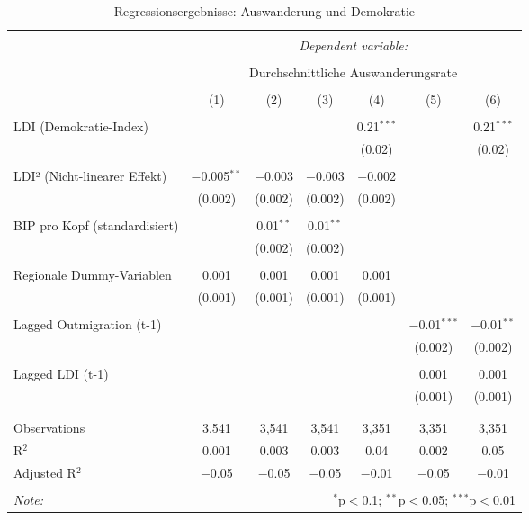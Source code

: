 
\begin{table}[!htbp] \centering 
  \caption{Regressionsergebnisse: Auswanderung und Demokratie} 
  \label{} 
\scriptsize 
\begin{tabular}{@{\extracolsep{2pt}}lcccccc} 
\\[-1.8ex]\hline 
\hline \\[-1.8ex] 
 & \multicolumn{6}{c}{\textit{Dependent variable:}} \\ 
\cline{2-7} 
\\[-1.8ex] & \multicolumn{6}{c}{Durchschnittliche Auswanderungsrate} \\ 
\\[-1.8ex] & (1) & (2) & (3) & (4) & (5) & (6)\\ 
\hline \\[-1.8ex] 
 LDI (Demokratie-Index) &  &  &  & 0.21$^{***}$ &  & 0.21$^{***}$ \\ 
  &  &  &  & (0.02) &  & (0.02) \\ 
  & & & & & & \\ 
 LDI² (Nicht-linearer Effekt) & $-$0.005$^{**}$ & $-$0.003 & $-$0.003 & $-$0.002 &  &  \\ 
  & (0.002) & (0.002) & (0.002) & (0.002) &  &  \\ 
  & & & & & & \\ 
 BIP pro Kopf (standardisiert) &  & 0.01$^{**}$ & 0.01$^{**}$ &  &  &  \\ 
  &  & (0.002) & (0.002) &  &  &  \\ 
  & & & & & & \\ 
 Regionale Dummy-Variablen & 0.001 & 0.001 & 0.001 & 0.001 &  &  \\ 
  & (0.001) & (0.001) & (0.001) & (0.001) &  &  \\ 
  & & & & & & \\ 
 Lagged Outmigration (t-1) &  &  &  &  & $-$0.01$^{***}$ & $-$0.01$^{**}$ \\ 
  &  &  &  &  & (0.002) & (0.002) \\ 
  & & & & & & \\ 
 Lagged LDI (t-1) &  &  &  &  & 0.001 & 0.001 \\ 
  &  &  &  &  & (0.001) & (0.001) \\ 
  & & & & & & \\ 
\hline \\[-1.8ex] 
Observations & 3,541 & 3,541 & 3,541 & 3,351 & 3,351 & 3,351 \\ 
R$^{2}$ & 0.001 & 0.003 & 0.003 & 0.04 & 0.002 & 0.05 \\ 
Adjusted R$^{2}$ & $-$0.05 & $-$0.05 & $-$0.05 & $-$0.01 & $-$0.05 & $-$0.01 \\ 
\hline 
\hline \\[-1.8ex] 
\textit{Note:}  & \multicolumn{6}{r}{$^{*}$p$<$0.1; $^{**}$p$<$0.05; $^{***}$p$<$0.01} \\ 
\end{tabular} 
\end{table} 
